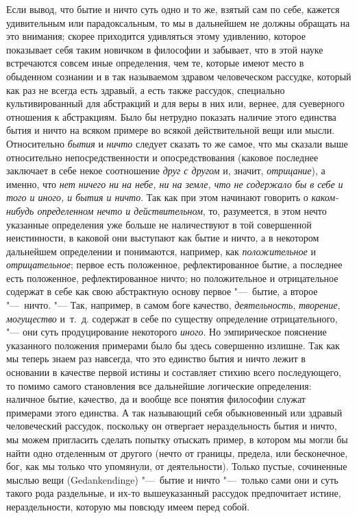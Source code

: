 Если вывод, что бытие и ничто суть одно и то же, взятый сам по себе, кажется
удивительным или парадоксальным, то мы в дальнейшем не должны обращать на
это внимания; скорее приходится удивляться этому удивлению, которое
показывает себя таким новичком в философии и забывает, что в этой науке
встречаются совсем иные определения, чем те, которые имеют место в
обыденном сознании и в так называемом здравом человеческом рассудке,
который как раз не всегда есть здравый, а есть также рассудок, специально
культивированный для абстракций и для веры в них или, вернее, для
суеверного отношения к абстракциям. Было бы нетрудно показать наличие этого
единства бытия и ничто на всяком примере во всякой действительной вещи или
мысли. Относительно {\em бытия} и
{\em ничто} следует сказать то же самое, что мы сказали
выше относительно непосредственности и опосредствования (каковое последнее
заключает в себе некое соотношение {\em друг с другом}
и, значит, {\em отрицание}), а именно, что
{\em нет ничего ни на небе, ни на земле, что не
содержало бы в себе и того и иного, и бытия и ничто}. Так как при этом
начинают говорить о {\em каком-нибудь определенном
нечто и действительном}, то, разумеется, в этом нечто указанные определения
уже больше не наличествуют в той совершенной неистинности, в каковой они
выступают как бытие и ничто, а в некотором дальнейшем определении и
понимаются, например, как {\em положительное} и
{\em отрицательное}; первое есть положенное,
рефлектированное бытие, а последнее есть положенное, рефлектированное
ничто; но положительное и отрицательное содержат в себе как свою
абстрактную основу первое "---~бытие, а второе "---~ничто. "--- Так, например, в
самом боге качество, {\em деятельность},
{\em творение}, {\em могущество}
и~т.~д. содержат в себе по существу определение отрицательного, "--- они суть
продуцирование некоторого {\em иного}. Но
эмпирическое пояснение указанного положения примерами было бы здесь
совершенно излишне. Так как мы теперь знаем раз навсегда, что это единство
бытия и ничто лежит в основании в качестве первой истины и составляет
стихию всего последующего, то помимо самого становления все дальнейшие
логические определения: наличное бытие, качество, да и вообще все понятия
философии служат примерами этого единства. А так называющий себя
обыкновенный или здравый человеческий рассудок, поскольку он отвергает
нераздельность бытия и ничто, мы можем пригласить сделать попытку отыскать
пример, в котором мы могли бы найти одно отделенным от другого (нечто от
границы, предела, или бесконечное, бог, как мы только что упомянули, от
деятельности). Только пустые, сочиненные мыслью вещи (Gedankendinge)
"---~бытие и ничто "---~только сами они и суть такого рода раздельные, и их-то
вышеуказанный рассудок предпочитает истине, нераздельности, которую мы
повсюду имеем перед собой.

